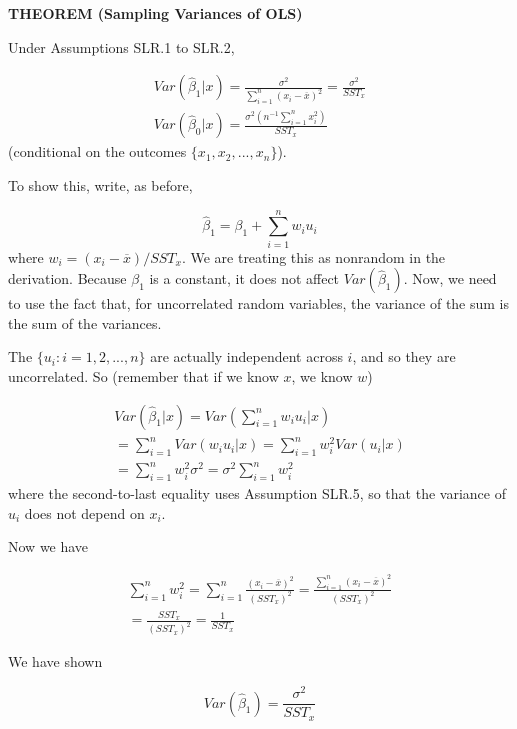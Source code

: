 \documentclass[notes=show]{beamer}
\begin{document}
\begin{frame}[plain]

 \textbf{THEOREM (Sampling Variances of OLS)}

 Under Assumptions SLR.1 to SLR.2,

 \begin{eqnarray*}
  Var(\hat{\beta}_{1}|x)=\frac{\sigma ^{2}}{\sum_{i=1}^{n}(x_{i}-\overline{x})^{2}}=\frac{\sigma ^{2}}{SST_{x}} \\
  Var(\hat{\beta}_{0}|x)=\frac{\sigma ^{2}\left(n^{-1}\sum_{i=1}^{n}x_{i}^{2}\right) }{SST_{x}}
 \end{eqnarray*}
(conditional on the outcomes $\{x_{1},x_{2},...,x_{n}\}$).
\end{frame}

\begin{frame}[plain]

 To show this, write, as before,

 \begin{equation}
  \hat{\beta}_{1}=\beta _{1}+\sum_{i=1}^{n}w_{i}u_{i}
 \end{equation}
 where $w_{i}=(x_{i}-\overline{x})/SST_{x}$. We are treating this as nonrandom in the derivation. Because $\beta _{1}$ is a constant, it does not affect $Var(\hat{\beta}_{1})$. Now, we need to use the fact that, for uncorrelated random variables, the variance of the sum is the sum of the variances.
\end{frame}

\begin{frame}[plain]

 The $\{u_{i}:i=1,2,...,n\}$ are actually independent across $i$, and so they are uncorrelated. So (remember that if we know $x$, we know $w$)

 \begin{eqnarray*}
  Var(\hat{\beta}_{1}|x)=Var\left( \sum_{i=1}^{n}w_{i}u_{i}|x\right) \\
  =\sum_{i=1}^{n}Var(w_{i}u_{i}|x)=\sum_{i=1}^{n}w_{i}^{2}Var(u_{i}|x) \\
  =\sum_{i=1}^{n}w_{i}^{2}\sigma^{2}=\sigma ^{2}\sum_{i=1}^{n}w_{i}^{2}
 \end{eqnarray*}
where the second-to-last equality uses Assumption SLR.5, so that the variance of $u_{i}$ does not depend on $x_{i}$.
\end{frame}

\begin{frame}[plain]

Now we have

 \begin{eqnarray*}
  \sum_{i=1}^{n}w_{i}^{2} =\sum_{i=1}^{n}\frac{(x_{i}-\overline{x})^{2}}{(SST_{x})^{2}}=\frac{\sum_{i=1}^{n}(x_{i}-\overline{x})^{2}}{(SST_{x})^{2}} \\
  =\frac{SST_{x}}{(SST_{x})^{2}}=\frac{1}{SST_{x}}
 \end{eqnarray*}

We have shown

 \begin{equation}
  Var(\hat{\beta}_{1})=\frac{\sigma ^{2}}{SST_{x}}
 \end{equation}

\end{frame}
\end{document}
